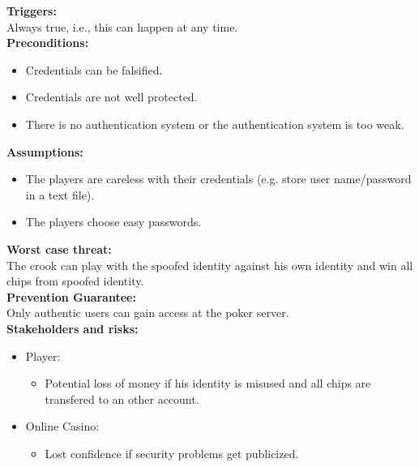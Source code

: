 \documentclass[a4paper,11pt]{report}
\begin{document}
\textbf{Triggers:}\\
Always true, i.e., this can happen at any time. \\
\textbf{Preconditions:}
\begin{itemize}
\item Credentials can be falsified.
\item Credentials are not well protected.
\item There is no authentication system or the authentication system is too weak.
\end{itemize}
\textbf{Assumptions:}
\begin{itemize}
\item The players are careless with their credentials (e.g. store user name/password in a text file).
\item The players choose easy passwords.
\end{itemize}
\textbf{Worst case threat:}\\
The crook can play with the spoofed identity against his own identity and win all chips from spoofed identity. \\
\textbf{Prevention Guarantee:} \\
Only authentic users can gain access at the poker server. \\
\textbf{Stakeholders and risks:}
\begin{itemize}
\item Player: 
\begin{itemize}
\item Potential loss of money if his identity is misused and all chips are transfered to an other account.
\end{itemize}
\item Online Casino: 
\begin{itemize}
\item Lost confidence if security problems get publicized.
\end{itemize}
\end{itemize}
\end{document}
